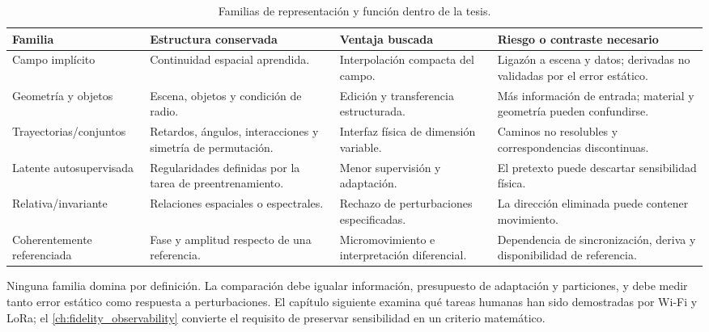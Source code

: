 \begin{table}[htbp]
\centering\scriptsize
\caption{Familias de representación y función dentro de la tesis.}
\label{tab:rf_representation_comparison}
\begin{tabularx}{\textwidth}{P{3.2cm}P{2.0cm}L L}
\toprule
Familia & Estructura conservada & Ventaja buscada & Riesgo o contraste necesario\\
\midrule
Campo implícito \citep{Zhao2023NeRF2} & Continuidad espacial aprendida. &
Interpolación compacta del campo. & Ligazón a escena y datos; derivadas no
validadas por el error estático.\\
Geometría y objetos \citep{Jiang2025LearnableWDT,Chen2025RFScape,Zhang2026RadTwin}
& Escena, objetos y condición de radio. & Edición y transferencia estructurada. &
Más información de entrada; material y geometría pueden confundirse.\\
Trayectorias/conjuntos \citep{Zaheer2017DeepSets} & Retardos, ángulos,
interacciones y simetría de permutación. & Interfaz física de dimensión variable. &
Caminos no resolubles y correspondencias discontinuas.\\
Latente autosupervisada \citep{Assran2023IJEPA,Kim2026WiFiJEPA} & Regularidades
definidas por la tarea de preentrenamiento. & Menor supervisión y adaptación. &
El pretexto puede descartar sensibilidad física.\\
Relativa/invariante & Relaciones espaciales o espectrales. & Rechazo de
perturbaciones especificadas. & La dirección eliminada puede contener movimiento.\\
Coherentemente referenciada & Fase y amplitud respecto de una referencia. &
Micromovimiento e interpretación diferencial. & Dependencia de sincronización,
deriva y disponibilidad de referencia.\\
\bottomrule
\end{tabularx}
\end{table}

Ninguna familia domina por definición. La comparación debe igualar información,
presupuesto de adaptación y particiones, y debe medir tanto error estático como
respuesta a perturbaciones. El capítulo siguiente examina qué tareas humanas han
sido demostradas por Wi-Fi y LoRa; el \cref{ch:fidelity_observability} convierte el
requisito de preservar sensibilidad en un criterio matemático.
